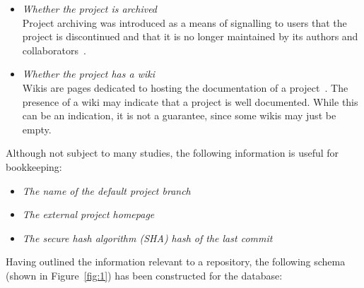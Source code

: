 \begin{itemize}
    \item \textit{Whether the project is archived}
    \\Project archiving was introduced as a means of signalling to users that the project is discontinued and that it is no longer maintained by its authors and collaborators~\cite{ARCHIVINGREPOS}.
    \item \textit{Whether the project has a wiki}
    \\Wikis are pages dedicated to hosting the documentation of a project~\cite{WIKIS}. The presence of a wiki may indicate that a project is well documented. While this can be an indication, it is not a guarantee, since some wikis may just be empty.
\end{itemize}

\noindent
Although not subject to many studies, the following information is useful for bookkeeping:

\begin{itemize}
    \item \textit{The name of the default project branch}
    \item \textit{The external project homepage}
    \item \textit{The secure hash algorithm (SHA) hash of the last commit}
\end{itemize}

\newpage

\noindent
Having outlined the information relevant to a repository, the following schema (shown in Figure~\ref{fig:1}) has been constructed for the database:

